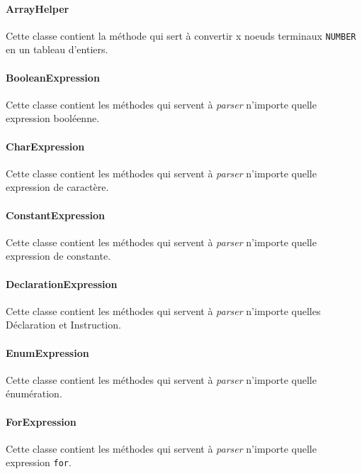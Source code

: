 \paragraph{ArrayHelper}

Cette classe contient la méthode qui sert à convertir x noeuds terminaux \texttt{NUMBER} en un tableau d'entiers.

\paragraph{BooleanExpression}

Cette classe contient les méthodes qui servent à \emph{parser} n'importe quelle expression booléenne.

\paragraph{CharExpression}

Cette classe contient les méthodes qui servent à \emph{parser} n'importe quelle expression de caractère.

\paragraph{ConstantExpression}

Cette classe contient les méthodes qui servent à \emph{parser} n'importe quelle expression de constante.

\paragraph{DeclarationExpression}

Cette classe contient les méthodes qui servent à \emph{parser} n'importe quelles Déclaration et Instruction.

\paragraph{EnumExpression}

Cette classe contient les méthodes qui servent à \emph{parser} n'importe quelle énumération.

\paragraph{ForExpression}

Cette classe contient les méthodes qui servent à \emph{parser} n'importe quelle expression \texttt{for}.

